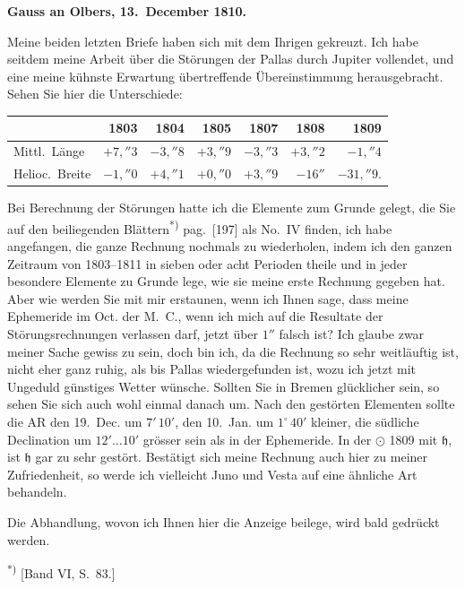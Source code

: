 \documentclass[12pt,a4paper]{article}
\newcommand{\Ceres}{\odot}
\newcommand{\Jupiter}{\mathfrak{h}}
\begin{document}
\newpage
\setcounter{page}{428}
%
\medskip\noindent
\textbf{Gauss an Olbers, 13.~December 1810.}

Meine beiden letzten Briefe haben sich mit dem Ihrigen gekreuzt. Ich habe seitdem meine Arbeit über die Störungen der Pallas durch Jupiter vollendet, und eine meine kühnste Erwartung übertreffende Übereinstimmung herausgebracht. Sehen Sie hier die Unterschiede:
\begin{center}
\begin{tabular}{l@{\quad}r@{\quad}r@{\quad}r@{\quad}r@{\quad}r@{\quad}r}
\toprule
& 1803 & 1804 & 1805 & 1807 & 1808 & 1809 \\
\midrule
Mittl.~Länge & $+7{,}''3$ & $-3{,}''8$ & $+3{,}''9$ & $-3{,}''3$ & $+3{,}''2$ & $-1{,}''4$ \\
Helioc.~Breite & $-1{,}''0$ & $+4{,}''1$ & $+0{,}''0$ & $+3{,}''9$ & $-16''$ & $-31{,}''9$. \\
\bottomrule
\end{tabular}
\end{center}
Bei Berechnung der Störungen hatte ich die Elemente zum Grunde gelegt, die Sie auf den beiliegenden Blättern\textsuperscript{*)} pag.~[197] als No.~IV finden, ich habe angefangen, die ganze Rechnung nochmals zu wiederholen, indem ich den ganzen Zeitraum von 1803--1811 in sieben oder acht Perioden theile und in jeder besondere Elemente zu Grunde lege, wie sie meine erste Rechnung gegeben hat. Aber wie werden Sie mit mir erstaunen, wenn ich Ihnen sage, dass meine Ephemeride im Oct. der M.~C., wenn ich mich auf die Resultate der Störungsrechnungen verlassen darf, jetzt über $1''$ falsch ist? Ich glaube zwar meiner Sache gewiss zu sein, doch bin ich, da die Rechnung so sehr weitläuftig ist, nicht eher ganz ruhig, als bis Pallas wiedergefunden ist, wozu ich jetzt mit Ungeduld günstiges Wetter wünsche. Sollten Sie in Bremen glücklicher sein, so sehen Sie sich auch wohl einmal danach um. Nach den gestörten Elementen sollte die AR den 19.~Dec. um $7'\,10'$, den 10.~Jan. um $1^\circ\,40'$ kleiner, die südliche Declination um $12'\ldots10'$ grösser sein als in der Ephemeride. In der $\Ceres$ 1809 mit $\Jupiter$, ist $\Jupiter$ gar zu sehr gestört. Bestätigt sich meine Rechnung auch hier zu meiner Zufriedenheit, so werde ich vielleicht Juno und Vesta auf eine ähnliche Art behandeln.

Die Abhandlung, wovon ich Ihnen hier die Anzeige beilege, wird bald gedrückt werden.

\smallskip\noindent\textsuperscript{*)} [Band VI, S.~83.]
\end{document}
